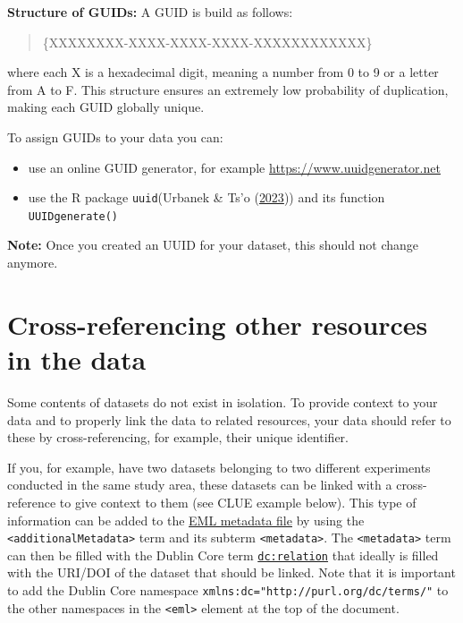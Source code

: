 \documentclass[
]{book}
\begin{document}
\textbf{Structure of GUIDs:} A GUID is build as follows:

\begin{quote}
\{XXXXXXXX-XXXX-XXXX-XXXX-XXXXXXXXXXXX\}
\end{quote}

where each X is a hexadecimal digit, meaning a number from 0 to 9 or a letter from A to F. This structure ensures an extremely low probability of duplication, making each GUID globally unique.

To assign GUIDs to your data you can:

\begin{itemize}
\item
  use an online GUID generator, for example \url{https://www.uuidgenerator.net}
\item
  use the R package \texttt{uuid}(Urbanek \& Ts'o (\protect\hyperlink{ref-R-uuid}{2023})) and its function \texttt{UUIDgenerate()}
\end{itemize}

\textbf{Note:} Once you created an UUID for your dataset, this should not change anymore.

\hypertarget{crossref-in-data}{%
\section{Cross-referencing other resources in the data}\label{crossref-in-data}}

Some contents of datasets do not exist in isolation. To provide context to your data and to properly link the data to related resources, your data should refer to these by cross-referencing, for example, their unique identifier.

If you, for example, have two datasets belonging to two different experiments conducted in the same study area, these datasets can be linked with a cross-reference to give context to them (see CLUE example below). This type of information can be added to the \protect\hyperlink{eml-terms}{EML metadata file} by using the \texttt{\textless{}additionalMetadata\textgreater{}} term and its subterm \texttt{\textless{}metadata\textgreater{}}. The \texttt{\textless{}metadata\textgreater{}} term can then be filled with the Dublin Core term \href{http://purl.org/dc/terms/relation}{\texttt{dc:relation}} that ideally is filled with the URI/DOI of the dataset that should be linked. Note that it is important to add the Dublin Core namespace \texttt{xmlns:dc="http://purl.org/dc/terms/"} to the other namespaces in the \texttt{\textless{}eml\textgreater{}} element at the top of the document.
\end{document}
